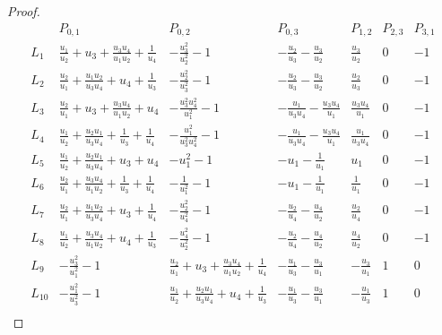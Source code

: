 \documentclass[a4paper,reqno]{amsart}
\numberwithin{equation}{section}
\numberwithin{equation}{section}
\begin{document}
\begin{proof}
\begin{table}[h]
    \begin{equation*}
    \begin{array}{c||c|c|c|c|c|c|}
             & P_{0,1}   & P_{0,2}    & P_{0,3}   & P_{1,2}   &  P_{2,3}   & P_{3,1}        \\
        \hline\hline 
        L_1  & \frac{u_1}{u_2}+u_3+\frac{u_3 u_4}{u_1 u_2}+\frac{1}{u_4}     & -\frac{u_3^2}{u_2^2}-1     & -\frac{u_2}{u_3}-\frac{u_3}{u_2}   & \frac{u_3}{u_2}  & 0   & -1           \\
        \hline
        L_2  &  \frac{u_2}{u_1}+\frac{u_1 u_2}{u_3 u_4}+u_4+\frac{1}{u_3}     & -\frac{u_2^2}{u_3^2}-1     & -\frac{u_2}{u_3}-\frac{u_3}{u_2}   & \frac{u_2}{u_3}  & 0   & -1           \\
        \hline
        L_3  & \frac{u_2}{u_1}+u_3+\frac{u_3 u_4}{u_1 u_2}+u_4     & -\frac{u_3^2 u_4^2}{u_1^2}-1  & -\frac{u_1}{u_3 u_4}-\frac{u_3 u_4}{u_1}  & \frac{u_3 u_4}{u_1}  & 0   & -1           \\
        \hline
        L_4  & \frac{u_1}{u_2}+\frac{u_2 u_1}{u_3 u_4}+\frac{1}{u_3}+\frac{1}{u_4}    &-\frac{u_1^2}{u_3^2 u_4^2}-1  & -\frac{u_1}{u_3 u_4}-\frac{u_3 u_4}{u_1}  & \frac{u_1}{u_3 u_4}  & 0   & -1           \\
        \hline
        L_5  & \frac{u_1}{u_2}+\frac{u_2 u_1}{u_3 u_4}+u_3+u_4    &-u_1^2-1  & -u_1-\frac{1}{u_1}  & u_1  & 0   & -1           \\
        \hline
        L_6  & \frac{u_2}{u_1}+\frac{u_3 u_4}{u_1 u_2}+\frac{1}{u_3}+\frac{1}{u_4}    &-\frac{1}{u_1^2}-1  & -u_1-\frac{1}{u_1}  & \frac{1}{u_1}  & 0   & -1           \\
        \hline
        L_7  & \frac{u_2}{u_1}+\frac{u_1 u_2}{u_3 u_4}+u_3+\frac{1}{u_4}    &-\frac{u_2^2}{u_4^2}-1  & -\frac{u_2}{u_4}-\frac{u_4}{u_2}  & \frac{u_2}{u_4}  & 0   & -1           \\
        \hline
        L_8  & \frac{u_1}{u_2}+\frac{u_3 u_4}{u_1 u_2}+u_4+\frac{1}{u_3}    &-\frac{u_4^2}{u_2^2}-1  & -\frac{u_2}{u_4}-\frac{u_4}{u_2}  & \frac{u_4}{u_2}  & 0   & -1           \\
        \hline\hline 
        L_9  & -\frac{u_3^2}{u_1^2}-1    &\frac{u_2}{u_1}+u_3+\frac{u_3 u_4}{u_1 u_2}+\frac{1}{u_4}  & -\frac{u_1}{u_3}-\frac{u_3}{u_1} & -\frac{u_3}{u_1}  & 1   & 0           \\
        \hline
        L_{10}  & -\frac{u_1^2}{u_3^2}-1 & \frac{u_1}{u_2}+\frac{u_2 u_1}{u_3 u_4}+u_4+\frac{1}{u_3} & -\frac{u_1}{u_3}-\frac{u_3}{u_1}  & -\frac{u_1}{u_3}  & 1   & 0           \\

\end{array}
\end{equation*}
\end{table}
\end{proof}
\end{document}
